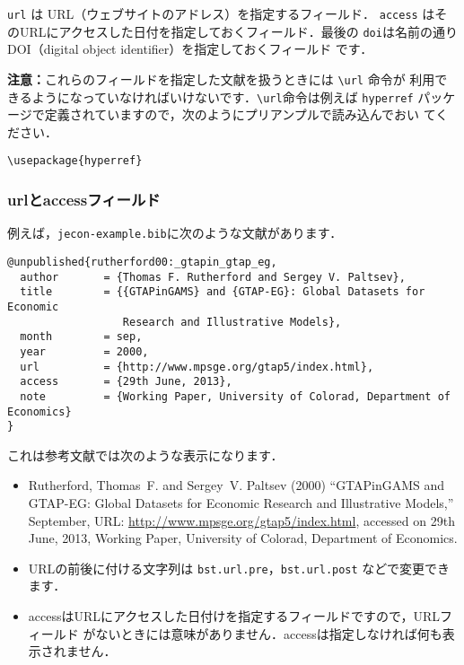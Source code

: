 \documentclass[a4j,10pt]{jarticle}
\begin{document}
\texttt{url} は URL（ウェブサイトのアドレス）を指定するフィールド．
\texttt{access} はそのURLにアクセスした日付を指定しておくフィールド．最後の
\texttt{doi}は名前の通りDOI（digital object identifier）を指定しておくフィールド
です．

\begin{screen}
 \textbf{注意：}これらのフィールドを指定した文献を扱うときには \verb|\url| 命令が
 利用できるようになっていなければいけないです．\verb|\url|命令は例えば
 \texttt{hyperref} パッケージで定義されていますので，次のようにプリアンプルで読み込んでおい
 てください．
 \begin{verbatim}
\usepackage{hyperref}
 \end{verbatim} 
\end{screen}

\subsubsection{urlとaccessフィールド}

例えば，\texttt{jecon-example.bib}に次のような文献があります．
\begin{verbatim}
@unpublished{rutherford00:_gtapin_gtap_eg,
  author       = {Thomas F. Rutherford and Sergey V. Paltsev},
  title        = {{GTAPinGAMS} and {GTAP-EG}: Global Datasets for Economic
                  Research and Illustrative Models},
  month        = sep,
  year         = 2000,
  url          = {http://www.mpsge.org/gtap5/index.html},
  access       = {29th June, 2013},
  note         = {Working Paper, University of Colorad, Department of Economics}
}
\end{verbatim}

これは参考文献では次のような表示になります．
\begin{screen}
 \begin{itemize}
  \item  Rutherford, Thomas~F. and Sergey~V. Paltsev (2000) ``{GTAPinGAMS} and
 {GTAP-EG}: Global Datasets for Economic Research and Illustrative Models,''
 September, URL: \url{http://www.mpsge.org/gtap5/index.html}, accessed on 29th
 June, 2013, Working Paper, University of Colorad, Department of Economics.
 \end{itemize}
\end{screen}

\begin{itemize}
 \item URLの前後に付ける文字列は \texttt{bst.url.pre}，\texttt{bst.url.post} などで変更できます．
 \item accessはURLにアクセスした日付けを指定するフィールドですので，URLフィールド
       がないときには意味がありません．accessは指定しなければ何も表示されません．
\end{itemize}
\end{document}

